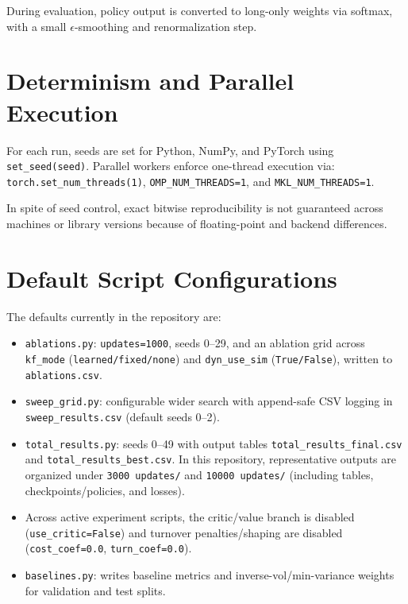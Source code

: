 During evaluation, policy output is converted to long-only weights via softmax,
with a small $\epsilon$-smoothing and renormalization step.

\section{Determinism and Parallel Execution}

For each run, seeds are set for Python, NumPy, and PyTorch using
\texttt{set\_seed(seed)}. Parallel workers enforce one-thread execution via:
\texttt{torch.set\_num\_threads(1)},
\texttt{OMP\_NUM\_THREADS=1}, and
\texttt{MKL\_NUM\_THREADS=1}.

In spite of seed control, exact bitwise reproducibility is not guaranteed
across machines or library versions because of floating-point and backend
differences.

\section{Default Script Configurations}

The defaults currently in the repository are:
\begin{itemize}
    \item \texttt{ablations.py}: \texttt{updates=1000}, seeds 0--29, and an
    ablation grid across \texttt{kf\_mode} (\texttt{learned/fixed/none}) and
    \texttt{dyn\_use\_sim} (\texttt{True/False}), written to
    \texttt{ablations.csv}.
    \item \texttt{sweep\_grid.py}: configurable wider search with append-safe
    CSV logging in \texttt{sweep\_results.csv} (default seeds 0--2).
    \item \texttt{total\_results.py}: seeds 0--49 with output tables
    \texttt{total\_results\_final.csv} and \texttt{total\_results\_best.csv}.
    In this repository, representative outputs are organized under
    \texttt{3000 updates/} and \texttt{10000 updates/}
    (including tables, checkpoints/policies, and losses).
    \item Across active experiment scripts, the critic/value branch is disabled
    (\texttt{use\_critic=False}) and turnover penalties/shaping are disabled
    (\texttt{cost\_coef=0.0}, \texttt{turn\_coef=0.0}).
    \item \texttt{baselines.py}: writes baseline metrics and inverse-vol/min-variance
    weights for validation and test splits.
\end{itemize}

